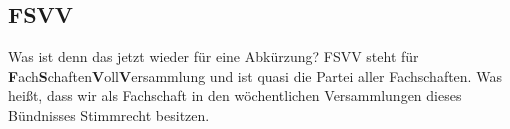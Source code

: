 

\subsection{FSVV} 
Was ist denn das jetzt wieder für eine Abkürzung? FSVV steht
für \textbf{F}ach\textbf{S}chaften\textbf{V}oll\textbf{V}ersammlung und ist
quasi die Partei aller Fachschaften. Was heißt, dass wir als Fachschaft in den
wöchentlichen Versammlungen dieses Bündnisses Stimmrecht besitzen.

